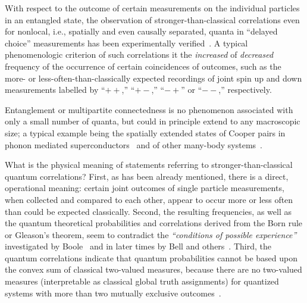 \documentclass[fleqn,twoside]{article}      %
\begin{document}
With respect to the outcome of certain measurements on the individual particles in an entangled state,
the observation of stronger-than-classical correlations even for nonlocal, i.e., spatially and even causally separated, quanta
in  ``delayed choice'' measurements has been experimentally verified~\cite{wjswz-98}.
A typical phenomenologic criterion of such correlations it the {\em increased} of {\em decreased} frequency of the occurrence of certain coincidences of outcomes,
such as the more- or less-often-than-classically expected recordings of joint spin up and down measurements labelled by ``$++$,'' ``$+-$,'' ``$-+$'' or ``$--$,'' respectively.

Entanglement or multipartite connectedness is no phenomenon associated with only a small number of quanta, but could in principle extend
to any macroscopic size; a typical example being the spatially extended states of Cooper pairs in phonon mediated superconductors~\cite{Weisskopf81}
and of other many-body systems~\cite{amico:517}.

What is the physical meaning of statements referring to stronger-than-classical quantum correlations?
First, as has been already mentioned, there is a direct, operational meaning: certain joint outcomes of single particle measurements, when collected and compared to each other,
appear to occur more or less often than could be expected classically.
Second, the resulting frequencies, as well as the quantum theoretical probabilities and correlations derived from the Born rule or Gleason's theorem,
seem to contradict the {\em ``conditions of possible experience''} investigated by Boole~\cite{Boole,Boole-62} and in later times by
Bell and others~\cite{bell,Pit-94,2000-poly}.
Third, the quantum correlations indicate that quantum probabilities cannot be based upon the convex sum of classical two-valued measures,
because there are no two-valued measures (interpretable as classical global truth assignments) for quantized systems
with more than two mutually exclusive outcomes~\cite{specker-60,kochen1,ZirlSchl-65,Alda,Alda2,kamber64,kamber65,svozil-tkadlec,cabello-96}.
\end{document}
